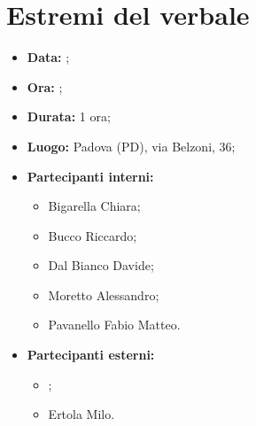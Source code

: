 \section{Estremi del verbale}
\begin{itemize}
	\item \textbf{Data:} ;
	\item \textbf{Ora:} ;
	\item \textbf{Durata:} 1 ora;
	\item \textbf{Luogo:} Padova (PD), via Belzoni, 36;
	\item \textbf{Partecipanti interni:}
	\begin{itemize}
		\item Bigarella Chiara;
		\item Bucco Riccardo;
		\item Dal Bianco Davide;
		\item Moretto Alessandro;
		\item Pavanello Fabio Matteo.
	\end{itemize}
	\item \textbf{Partecipanti esterni:}
	\begin{itemize}
		\item \proponente;
		\item Ertola Milo.
	\end{itemize}
\end{itemize}
\newpage

